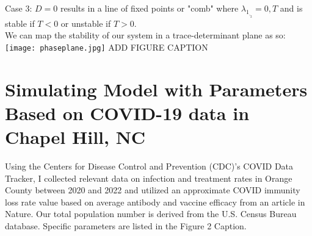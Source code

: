 \documentclass[%
 reprint,
]{revtex4-2}
\begin{document}
Case 3: $D=0$ results in a line of fixed points or "comb" where $\lambda_1_,_2 = 0,T$ and is stable if $T<0$ or unstable if $T>0$.\\
We can map the stability of our system in a trace-determinant plane as so: \\

\texttt{[image: phaseplane.jpg]}
ADD FIGURE CAPTION
\section{\label{sec:level1}Simulating Model with Parameters Based on COVID-19 data in Chapel Hill, NC\protect\\}

Using the Centers for Disease Control and Prevention (CDC)'s COVID Data Tracker, I collected relevant data on infection and treatment rates in Orange County between 2020 and 2022 and utilized an approximate COVID immunity loss rate value based on average antibody and vaccine efficacy from an article in Nature. Our total population number is derived from the U.S. Census Bureau database. Specific parameters are listed in the Figure 2 Caption. 


\end{document}
